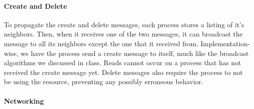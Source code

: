 \documentclass{article}
\begin{document}
\paragraph*{Create and Delete}
To propagate the create and delete messages, each process stores a listing of it's neighbors. Then, when it receives one of the two messages, it can broadcast the message to all its neighbors except the one that it received from. Implementation-wise, we have the process send a create message to itself, much like the broadcast algorithms we discussed in class. Reads cannot occur on a process that has not received the create message yet. Delete messages also require the process to not be using the resource, preventing any possibly erroneous behavior.

\paragraph*{Networking}
\end{document}
